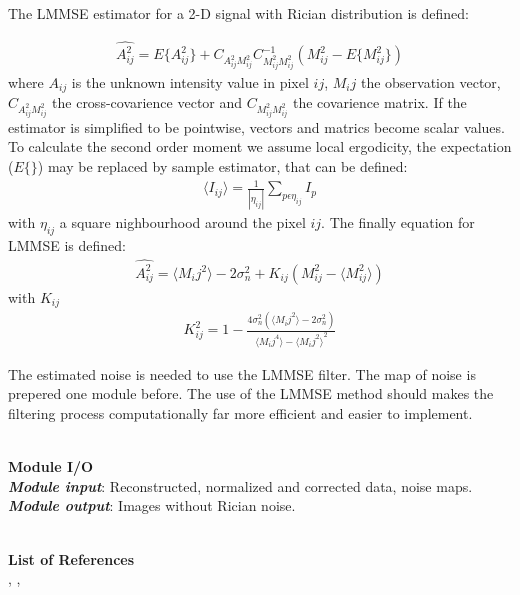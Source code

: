 The LMMSE estimator for a 2-D signal with Rician distribution is defined:

\begin{equation}
\begin{aligned}\widehat{A_{ij}^{2}}=E\{A_{ij}^{2}\}+C_{A_{ij}^{2}M_{ij}^{2}}C_{M_{ij}^{2}M_{ij}^{2}}^{-1}(M_{ij}^{2}-E\{M_{ij}^{2}\})\end{aligned}
\label{m4eq1}
\end{equation}
where $A_{ij}$ is the unknown intensity value in pixel $ij$, $M_{i}j$
the observation vector, $C_{A_{ij}^{2}M_{ij}^{2}}$ the cross-covarience
vector and $C_{M_{ij}^{2}M_{ij}^{2}}$ the covarience matrix. If the
estimator is simplified to be pointwise, vectors and matrics become
scalar values. 
To calculate the second order moment we assume local ergodicity, the expectation ($E\{\}$) may be replaced by sample estimator, that can be defined: 
\begin{equation}
\begin{aligned}\langle I_{ij}\rangle=\frac{1}{|\eta_{ij}|}\sum\limits_{p\epsilon\eta_{ij}} I_p \end{aligned}
\label{m4eq2}
\end{equation}
with $\eta_{ij}$ a square nighbourhood around the pixel $ij$. The finally equation for LMMSE is defined:
\begin{equation}
\begin{aligned}\widehat{A_{ij}^{2}}=\langle M_{i}j^{2}\rangle-2\sigma_{n}^{2}+K_{ij}(M_{ij}^{2}-\langle M_{ij}^{2}\rangle)\end{aligned}
\label{m4eq3}
\end{equation}
with $K_{ij}$ 
\begin{equation}
\begin{aligned}K_{ij}^{2}=1-\frac{4\sigma_{n}^{2}(\langle M_{i}j^{2}\rangle-2\sigma_{n}^{2})}{\langle M_{i}j^{4}\rangle-{\langle M_{i}j^{2}\rangle}^{2}}\end{aligned}
\label{m4eq4}
\end{equation}

The estimated noise is needed to use the LMMSE filter. The map of noise is prepered one module before. The use of the LMMSE method should makes the filtering process computationally far more efficient and easier to implement. 

\hfill{}\\
\textbf{Module I/O}\\
\textbf{\emph{Module input}}: Reconstructed, normalized and corrected data, noise maps.
\textbf{\emph{Module output}}: Images without Rician noise.

\hfill{}\\
\textbf{List of References}\\
\cite{4_lmmse}, \cite{4art}, \cite{5a2}
